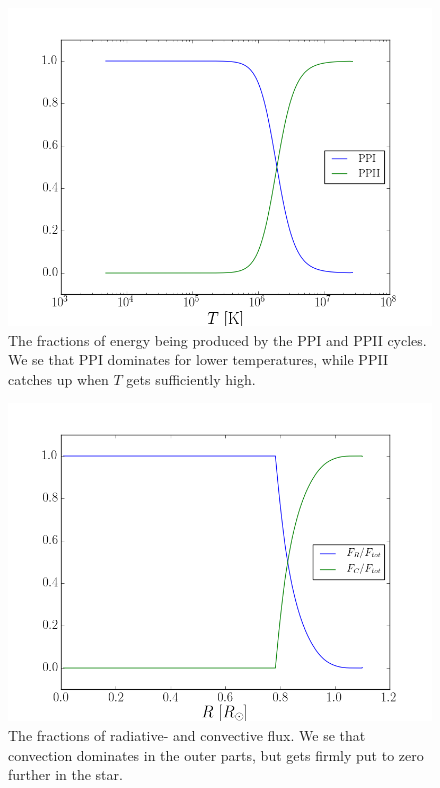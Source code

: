 \documentclass[11pt]{article}
\begin{document}
\begin{figure}
    \center
    \includegraphics[width=\linewidth]{fig/eps_fracs.png}
    \caption{\label{fig:eps_fracs.png} The fractions of energy being produced by the PPI and PPII cycles. We se that PPI dominates for lower temperatures, while PPII catches up when $T$ gets sufficiently high.}
\end{figure}

\begin{figure}
    \center
    \includegraphics[width=\linewidth, height=0.4\textheight]{fig/flux_fracs.png}
    \caption{\label{fig:flux_fracs.png} The fractions of radiative- and convective flux. We se that convection dominates in the outer parts, but gets firmly put to zero further in the star.}
\end{figure}
\end{document}
